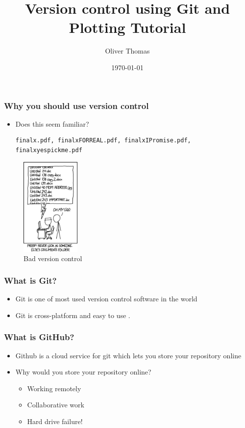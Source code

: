 \documentclass{beamer}
\title{Version control using Git and Plotting Tutorial}
\author{Oliver Thomas}
\institute{Quantum Engineering CDT \\ University of Bristol}
\date{\today}
\begin{document}
\frame{\titlepage}

\begin{frame}
\frametitle{Why you should use version control}
\begin{itemize}
	\item Does this seem familiar? 
\begin{verbatim}
finalx.pdf, finalxFORREAL.pdf, finalxIPromise.pdf, finalxyespickme.pdf 
\end{verbatim}
\end{itemize}
\begin{figure}[H]
	\centering
	\includegraphics[width=0.26\textwidth]{xkcdversion.png}
	\caption{Bad version control\footnotemark }
	\label{fig:xkcdversion}
\end{figure}
\end{frame}

\begin{frame}
\frametitle{What is Git?}
\begin{itemize}
\item Git is one of most used version control software in the world 
\item Git is cross-platform and easy to use \footnotemark.
\end{itemize}
\end{frame}

\begin{frame}
\frametitle{What is GitHub?}
\begin{itemize} 
\item Github is a cloud service for git which lets you store your repository online
\item Why would you store your repository online?
\begin{itemize}
\item Working remotely
\item Collaborative work  
\item Hard drive failure!
\end{itemize}
\end{itemize}
\end{frame}
\end{document}
